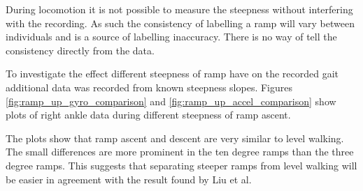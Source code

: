 During locomotion it is not possible to measure the steepness without interfering with the recording. As such the consistency of labelling a ramp will vary between individuals and is a source of labelling inaccuracy. There is no way of tell the consistency directly from the data.

To investigate the effect different steepness of ramp have on the recorded gait additional data was recorded from known steepness slopes. Figures \ref{fig:ramp_up_gyro_comparison} and \ref{fig:ramp_up_accel_comparison} show plots of right ankle data during different steepness of ramp ascent.

The plots show that ramp ascent and descent are very similar to level walking. The small differences are more prominent in the ten degree ramps than the three degree ramps. This suggests that separating steeper ramps from level walking will be easier in agreement with the result found by Liu et al\cite{Liu2021}.

